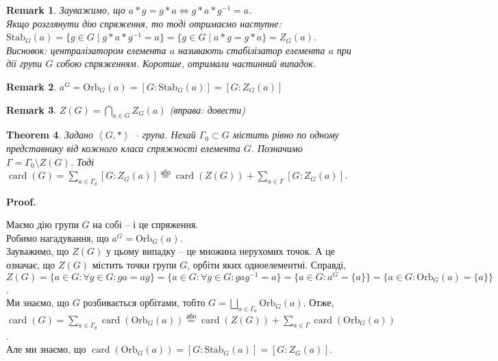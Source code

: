 \documentclass[a4paper, 10pt]{article}
\makeatletter
\theoremstyle{theoremdd}
\newtheorem{theorem}{Theorem}[subsection]
\theoremstyle{theoremdd}
\theoremstyle{theoremdd}
\theoremstyle{theoremdd}
\theoremstyle{theoremdd}
\theoremstyle{theoremdd}
\theoremstyle{theoremdd}
\theoremstyle{theoremdd}
\theoremstyle{theoremdd}
\theoremstyle{theoremdd}
\theoremstyle{theoremdd}
\newtheorem{remark}[theorem]{Remark}
\theoremstyle{theoremdd}
\theoremstyle{theoremdd}
\theoremstyle{theoremdd}
\theoremstyle{theoremdd}
\renewenvironment{proof}[1][Proof.\\]{\par
\pushQED{\hfill \qed}%
\normalfont \topsep6\p@\@plus6\p@\relax
\trivlist
\item\relax
{\bfseries
#1\@addpunct{.}}\hspace\labelsep\ignorespaces
}{%
\popQED\endtrivlist\@endpefalse
}
\DeclareMathOperator{\card}{card}
\newcommand\Orb{\text{Orb}}
\newcommand\Stab{\text{Stab}}
\makeatother
\begin{document}
\begin{remark}
Зауважимо, що $a*g = g*a \iff g*a*g^{-1} = a$.\\
Якщо розглянути дію спряження, то тоді отримаємо наступне:\\
$\Stab_G(a) = \{ g \in G \mid g*a*g^{-1} = a \} = \{g \in G \mid a*g = g*a\} = Z_G(a)$.\\
Висновок: централізатором елемента $a$ називають стабілізатор елемента $a$ при дії групи $G$ собою спряженням. Коротше, отримали частинний випадок.
\end{remark}

\begin{remark}
$a^G = \Orb_G(a) = [G: \Stab_G(a)] = [G: Z_G(a)]$
\end{remark}

\begin{remark}
$Z(G) = \displaystyle\bigcap_{a \in G} Z_G(a)$ \textit{(вправа: довести)}
\end{remark}

\begin{theorem}
Задано $\left< G,* \right>$ -- група. Нехай $\Gamma_0 \subset G$ містить рівно по одному представнику від кожного класа спряжності елемента $G$. Позначимо $\Gamma = \Gamma_0 \setminus Z(G)$. Тоді\\
$\card(G) = \displaystyle\sum_{a \in \Gamma_0} [G: Z_G(a)] \overset{\text{або}}{=} \card(Z(G)) + \sum_{a \in \Gamma} [G: Z_G(a)]$.
\end{theorem}

\begin{proof}
Маємо дію групи $G$ на собі -- і це спряження. \\
Робимо нагадування, що $a^G = \Orb_G(a)$.\\
Зауважимо, що $Z(G)$ у цьому випадку -- це множина нерухомих точок. А це означає, що $Z(G)$ містить точки групи $G$, орбіти яких одноелементні. Справді,\\
$Z(G) = \{ a \in G: \forall g \in G: ga = ag \} = \{a \in G: \forall g \in G: gag^{-1} = a\} = \{a \in G: a^G = \{a\}\} = \{a \in G: \Orb_G(a) = \{a\}\}$.\\
Ми знаємо, що $G$  розбивається орбітами, тобто $G = \displaystyle\bigsqcup_{a \in \Gamma_0} \Orb_G(a)$. Отже,\\
$\card(G) = \displaystyle\sum_{a \in \Gamma_0} \card(\Orb_G(a)) \overset{\text{або}}{=} \card(Z(G)) + \sum_{a \in \Gamma} \card(\Orb_G(a))$.\\
Але ми знаємо, що $\card(\Orb_G(a)) = [G:\Stab_G(a)] = [G:Z_G(a)]$.
\end{proof}
\end{document}
